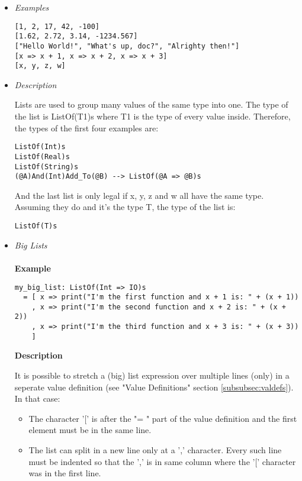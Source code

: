 \documentclass{article}
\begin{document}
\begin{itemize}

\item \textit{Examples}
\begin{verbatim}
[1, 2, 17, 42, -100]
[1.62, 2.72, 3.14, -1234.567]
["Hello World!", "What's up, doc?", "Alrighty then!"]
[x => x + 1, x => x + 2, x => x + 3]
[x, y, z, w]
\end{verbatim}

\item \textit{Description}

Lists are used to group many values of the same type into one. 
The type of the list is ListOf(T1)s where T1 is the type of every value inside.
Therefore, the types of the first four examples are:
\begin{verbatim}
ListOf(Int)s
ListOf(Real)s
ListOf(String)s
(@A)And(Int)Add_To(@B) --> ListOf(@A => @B)s
\end{verbatim}
And the last list is only legal if x, y, z and w all have the same type.
Assuming they do and it's the type T, the type of the list is: 
\begin{verbatim}
ListOf(T)s
\end{verbatim}

\newpage
\item \textit{Big Lists}
  \\\\
  \textbf{Example}

  \begin{verbatim}
my_big_list: ListOf(Int => IO)s
  = [ x => print("I'm the first function and x + 1 is: " + (x + 1))
    , x => print("I'm the second function and x + 2 is: " + (x + 2))
    , x => print("I'm the third function and x + 3 is: " + (x + 3))
    ]
  \end{verbatim}

  \textbf{Description} 

  It is possible to stretch a (big) list expression over multiple lines (only)
  in a seperate value definition (see "Value Definitions" section
  \ref{subsubsec:valdefs}).  In that case:
  \begin{itemize}
  \item
  The character '[' is after the "= " part of the value definition
  and the first element must be in the same line.

  \item
  The list can split in a new line only at a ',' character. Every such line
  must be indented so that the ',' is in same column where the '[' character
  was in the first line.


\end{itemize}
\end{itemize}
\end{document}
